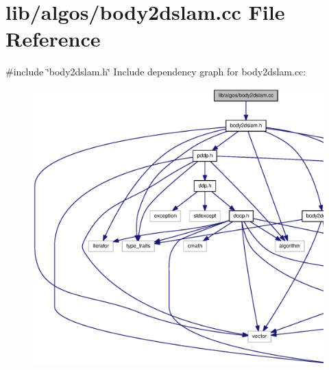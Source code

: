 \section{lib/algos/body2dslam.cc \-File \-Reference}
\label{body2dslam_8cc}
{\ttfamily \#include \char`\"{}body2dslam.\-h\char`\"{}}\*
\-Include dependency graph for body2dslam.\-cc\-:\nopagebreak
\begin{figure}[H]
\begin{center}
\leavevmode
\includegraphics[width=350pt]{body2dslam_8cc__incl}
\end{center}
\end{figure}

